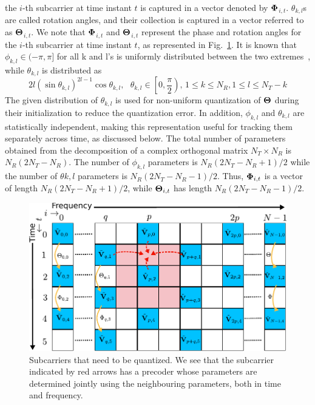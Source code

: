 \documentclass[journal,10pt,twocolumn]{IEEEtran}
\begin{document}
the $i$-th subcarrier at time instant $t$ is captured in a vector
denoted by $\bf{\Phi}$$_{i,t}$. $\theta_{k,l}$s are called rotation angles, and
their collection is captured in a vector referred to as
$\bf{\Theta}$$_{i,t}$. We note that $\bf{\Phi}$$_{i,t}$ and $\bf{\Theta}$$_{i,t}$ represent
the phase and rotation angles for the $i$-th subcarrier at time
instant $t$, as represented in Fig.~\ref{fig:adpm-fig}. It is known
that $\phi_{k,l} \in (-\pi, \pi]$ for all k and l's is uniformly distributed 
between the two
extremes~\cite{4114278}, while $\theta_{k,l}$ is distributed
as~\cite{4114278}
\begin{equation}
2l(\sin\theta_{k,l})^{2l-1}\cos\theta_{k,l}, \mbox{  }\theta_{k,l} \in \left[0, \frac{\pi}{2}\right) \mbox{, }1\leq k \leq N_R, 1\leq l 
\leq N_T -k
\end{equation}
The given distribution of $\theta_{k,l}$ is used for non-uniform quantization
of $\bf{\Theta}$ during their initialization to reduce the quantization error.
In addition, $\phi_{k,l}$ and $\theta_{k,l}$ are statistically independent,
making this representation useful for tracking them separately across
time, as discussed below. The total number of
parameters obtained from the decomposition of a complex orthogonal
matrix $N_{T} \times N_{R} $ is $N_{R}(2N_{T} - N_{R})$. The number of
$\phi_{k,l}$ parameters is $N_{R}(2N_{T} - N_{R}+1)/2$ while the number of
$\theta{k,l}$ parameters is $N_{R}(2N_{T} - N_{R}-1)/2$. Thus, ${\bf{\Phi}}_{i,t}$
is a vector of length $N_{R}(2N_{T} - N_{R}+1)/2$, while
${\bf{\Theta}}_{i,t}$ has length $N_{R}(2N_{T} - N_{R}-1)/2$.~\cite{4114278}
\begin{figure}
\begin{center}
\includegraphics[width=0.7\columnwidth]{images/new-adpm.pdf}
\caption{\label{fig:adpm-fig}Subcarriers that need to be
  quantized. We see that the subcarrier indicated by
  red arrows has a precoder whose parameters are determined jointly
  using the neighbouring parameters, both in time and frequency.}
\end{center}
\end{figure}
\end{document}

